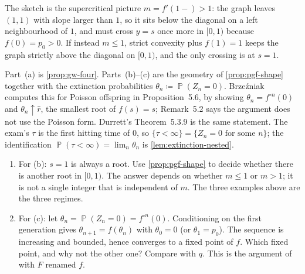 \documentclass[11pt,a4paper]{article}
\DeclareMathOperator{\Pbb}{\mathbb{P}}
\begin{document}
The sketch is the supercritical picture \(m=f'(1-)>1\): the graph leaves \((1,1)\) with slope larger than \(1\), so it sits below the diagonal on a left neighbourhood of \(1\), and must cross \(y=s\) once more in \([0,1)\) because \(f(0)=p_0>0\). If instead \(m\le 1\), strict convexity plus \(f(1)=1\) keeps the graph strictly above the diagonal on \([0,1)\), and the only crossing is at \(s=1\).

\begin{remark}
\label{rem:p5-toolkit}
Part~(a) is \cref{prop:gw-four}. Parts~(b)--(c) are the geometry of \cref{prop:pgf-shape} together with the extinction probabilities \(\theta_n\coloneqq\Pbb(Z_n=0)\). Brzeźniak computes this for Poisson offspring in Proposition~5.6, by showing \(\theta_n=f^{\circ n}(0)\) and \(\theta_n\uparrow\hat r\), the smallest root of \(f(s)=s\); Remark~5.2 says the argument does not use the Poisson form. Durrett's Theorem~5.3.9 is the same statement. The exam's \(\tau\) is the first hitting time of \(0\), so \(\{\tau<\infty\}=\{Z_n=0\text{ for some }n\}\); the identification \(\Pbb(\tau<\infty)=\lim_n\theta_n\) is \cref{lem:extinction-nested}.
\end{remark}

\begin{remark}
\label{rem:p5-hints}
\begin{enumerate}[label=\textup{(\arabic*)}]
    \item
    For (b): \(s=1\) is always a root. Use \cref{prop:pgf-shape} to decide whether there is another root in \([0,1)\). The answer depends on whether \(m\le 1\) or \(m>1\); it is not a single integer that is independent of \(m\). The three examples above are the three regimes.
    \item
    For (c): let \(\theta_n=\Pbb(Z_n=0)=f^{\circ n}(0)\). Conditioning on the first generation gives \(\theta_{n+1}=f(\theta_n)\) with \(\theta_0=0\) (or \(\theta_1=p_0\)). The sequence is increasing and bounded, hence converges to a fixed point of \(f\). Which fixed point, and why not the other one? Compare with \(q\). This is the argument of \citep[Proposition~5.6]{brzezniak1999} with \(F\) renamed \(f\).
\end{enumerate}
\end{remark}
\end{document}
